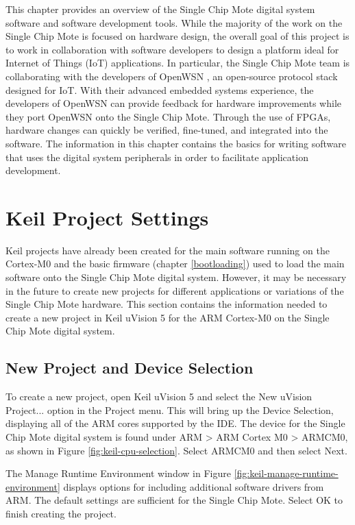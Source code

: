 This chapter provides an overview of the Single Chip Mote digital system software and software development tools. While the majority of the work on the Single Chip Mote is focused on hardware design, the overall goal of this project is to work in collaboration with software developers to design a platform ideal for Internet of Things (IoT) applications. In particular, the Single Chip Mote team is collaborating with the developers of OpenWSN \cite{openwsn}, an open-source protocol stack designed for IoT. With their advanced embedded systems experience, the developers of OpenWSN can provide feedback for hardware improvements while they port OpenWSN onto the Single Chip Mote. Through the use of FPGAs, hardware changes can quickly be verified, fine-tuned, and integrated into the software. The information in this chapter contains the basics for writing software that uses the digital system peripherals in order to facilitate application development.

\section{Keil Project Settings} \label{keil-project-settings}
Keil projects have already been created for the main software running on the Cortex-M0 and the basic firmware (chapter \ref{bootloading}) used to load the main software onto the Single Chip Mote digital system. However, it may be necessary in the future to create new projects for different applications or variations of the Single Chip Mote hardware. This section contains the information needed to create a new project in Keil uVision 5 for the ARM Cortex-M0 on the Single Chip Mote digital system.

\subsection{New Project and Device Selection}
To create a new project, open Keil uVision 5 and select the New uVision Project... option in the Project menu. This will bring up the Device Selection, displaying all of the ARM cores supported by the IDE. The device for the Single Chip Mote digital system is found under ARM > ARM Cortex M0 > ARMCM0, as shown in Figure \ref{fig:keil-cpu-selection}. Select ARMCM0 and then select Next.

The Manage Runtime Environment window in Figure \ref{fig:keil-manage-runtime-environment} displays options for including additional software drivers from ARM. The default settings are sufficient for the Single Chip Mote. Select OK to finish creating the project.

